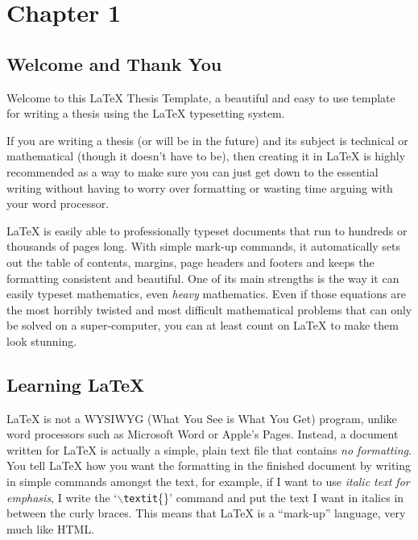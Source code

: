 
\chapter{Chapter 1} %

\label{Chapter1} %


\section{Welcome and Thank You}
Welcome to this \LaTeX{} Thesis Template, a beautiful and easy to use template for writing a thesis using the \LaTeX{} typesetting system.

If you are writing a thesis (or will be in the future) and its subject is technical or mathematical (though it doesn't have to be), then creating it in \LaTeX{} is highly recommended as a way to make sure you can just get down to the essential writing without having to worry over formatting or wasting time arguing with your word processor.

\LaTeX{} is easily able to professionally typeset documents that run to hundreds or thousands of pages long. With simple mark-up commands, it automatically sets out the table of contents, margins, page headers and footers and keeps the formatting consistent and beautiful. One of its main strengths is the way it can easily typeset mathematics, even \emph{heavy} mathematics. Even if those equations are the most horribly twisted and most difficult mathematical problems that can only be solved on a super-computer, you can at least count on \LaTeX{} to make them look stunning.


\section{Learning \LaTeX{}}

\LaTeX{} is not a WYSIWYG (What You See is What You Get) program, unlike word processors such as Microsoft Word or Apple's Pages. Instead, a document written for \LaTeX{} is actually a simple, plain text file that contains \emph{no formatting}. You tell \LaTeX{} how you want the formatting in the finished document by writing in simple commands amongst the text, for example, if I want to use \textit{italic text for emphasis}, I write the `$\backslash$\texttt{textit}\{\}' command and put the text I want in italics in between the curly braces. This means that \LaTeX{} is a ``mark-up'' language, very much like HTML.

